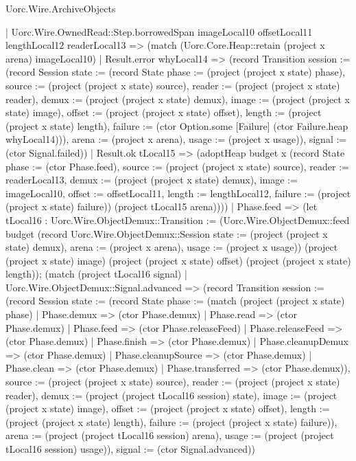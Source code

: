 \begin{lexlean}{Uorc.Wire.ArchiveObjects}
\begin{semanticmodule}
{          | Uorc.Wire.OwnedRead::Step.borrowedSpan imageLocal10 offsetLocal11 lengthLocal12 readerLocal13 => (match (Uorc.Core.Heap::retain (project x arena) imageLocal10)
            | Result.error whyLocal14 => (record Transition {session := (record Session {state := (record State {phase := (project (project x state) phase), source := (project (project x state) source), reader := (project (project x state) reader), demux := (project (project x state) demux), image := (project (project x state) image), offset := (project (project x state) offset), length := (project (project x state) length), failure := (ctor Option.some [Failure] (ctor Failure.heap whyLocal14))}), arena := (project x arena), usage := (project x usage)}), signal := (ctor Signal.failed)})
            | Result.ok tLocal15 => (adoptHeap budget x (record State {phase := (ctor Phase.feed), source := (project (project x state) source), reader := readerLocal13, demux := (project (project x state) demux), image := imageLocal10, offset := offsetLocal11, length := lengthLocal12, failure := (project (project x state) failure)}) (project tLocal15 arena))))
        | Phase.feed => (let tLocal16 : Uorc.Wire.ObjectDemux::Transition := (Uorc.Wire.ObjectDemux::feed budget (record Uorc.Wire.ObjectDemux::Session {state := (project (project x state) demux), arena := (project x arena), usage := (project x usage)}) (project (project x state) image) (project (project x state) offset) (project (project x state) length)); (match (project tLocal16 signal)
          | Uorc.Wire.ObjectDemux::Signal.advanced => (record Transition {session := (record Session {state := (record State {phase := (match (project (project x state) phase)
            | Phase.demux => (ctor Phase.demux)
            | Phase.read => (ctor Phase.demux)
            | Phase.feed => (ctor Phase.releaseFeed)
            | Phase.releaseFeed => (ctor Phase.demux)
            | Phase.finish => (ctor Phase.demux)
            | Phase.cleanupDemux => (ctor Phase.demux)
            | Phase.cleanupSource => (ctor Phase.demux)
            | Phase.clean => (ctor Phase.demux)
            | Phase.transferred => (ctor Phase.demux)), source := (project (project x state) source), reader := (project (project x state) reader), demux := (project (project tLocal16 session) state), image := (project (project x state) image), offset := (project (project x state) offset), length := (project (project x state) length), failure := (project (project x state) failure)}), arena := (project (project tLocal16 session) arena), usage := (project (project tLocal16 session) usage)}), signal := (ctor Signal.advanced)})
}
\end{semanticmodule}
\end{lexlean}
